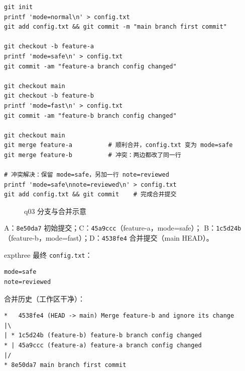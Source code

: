 \documentclass[11pt,a4paper,fontset=none]{ctexart}
\newcommand{\sublabel}[2]{%
  \par\vspace{1em}\noindent{\bfseries\color{#1!75!black}#2}\par\nobreak\vspace{0.25em}\noindent\ignorespaces
}
\begin{document}
\sublabel{expthree}{\faGit\ 操作过程}
\begin{lstlisting}[style=shell]
git init
printf 'mode=normal\n' > config.txt
git add config.txt && git commit -m "main branch first commit"

git checkout -b feature-a
printf 'mode=safe\n' > config.txt
git commit -am "feature-a branch config changed"

git checkout main
git checkout -b feature-b
printf 'mode=fast\n' > config.txt
git commit -am "feature-b branch config changed"

git checkout main
git merge feature-a          # 顺利合并，config.txt 变为 mode=safe
git merge feature-b          # 冲突：两边都改了同一行

# 冲突解决：保留 mode=safe，另加一行 note=reviewed
printf 'mode=safe\nnote=reviewed\n' > config.txt
git add config.txt && git commit    # 完成合并提交
\end{lstlisting}

\sublabel{expthree}{\faProjectDiagram\ 分支与合并示意}
\begin{figure}[htbp]
  \centering
  \caption{q03 分支与合并示意}
  \label{fig:q3git}
\end{figure}
A：\texttt{8e50da7} 初始提交；C：\texttt{45a9ccc}（feature-a，mode=safe）；
B：\texttt{1c5d24b}（feature-b，mode=fast）；D：\texttt{4538fe4} 合并提交（main HEAD）。

\begin{resbox}{expthree}
最终 \texttt{config.txt}：
\begin{lstlisting}[style=output]
mode=safe
note=reviewed
\end{lstlisting}
合并历史（工作区干净）：
\begin{lstlisting}[style=output]
*   4538fe4 (HEAD -> main) Merge feature-b and ignore its change
|\
| * 1c5d24b (feature-b) feature-b branch config changed
* | 45a9ccc (feature-a) feature-a branch config changed
|/
* 8e50da7 main branch first commit
\end{lstlisting}
\end{resbox}
\end{document}
